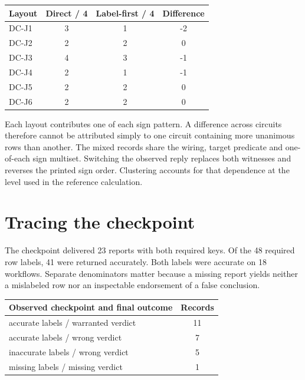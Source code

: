 \documentclass[12pt,letterpaper]{article}
\begin{document}
\begin{center}{\small\setlength{\tabcolsep}{4pt}\begin{tabularx}{\linewidth}{@{}Yccc@{}}\toprule
Layout & Direct / 4 & Label-first / 4 & Difference\\ \midrule
DC-J1 & 3 & 1 & -2\\
DC-J2 & 2 & 2 & 0\\
DC-J3 & 4 & 3 & -1\\
DC-J4 & 2 & 1 & -1\\
DC-J5 & 2 & 2 & 0\\
DC-J6 & 2 & 2 & 0\\
\bottomrule\end{tabularx}}\end{center}

Each layout contributes one of each sign pattern. A difference across circuits therefore cannot be attributed simply to one circuit containing more unanimous rows than another. The mixed records share the wiring, target predicate and one-of-each sign multiset. Switching the observed reply replaces both witnesses and reverses the printed sign order. Clustering accounts for that dependence at the level used in the reference calculation.

\section{Tracing the checkpoint}

The checkpoint delivered 23 reports with both required keys. Of the 48 required row labels, 41 were returned accurately. Both labels were accurate on 18 workflows. Separate denominators matter because a missing report yields neither a mislabeled row nor an inspectable endorsement of a false conclusion.

\begin{center}{\small\setlength{\tabcolsep}{4pt}\begin{tabularx}{\linewidth}{@{}Yc@{}}\toprule
Observed checkpoint and final outcome & Records\\ \midrule
accurate labels / warranted verdict & 11\\
accurate labels / wrong verdict & 7\\
inaccurate labels / wrong verdict & 5\\
missing labels / missing verdict & 1\\
\bottomrule\end{tabularx}}\end{center}
\end{document}
